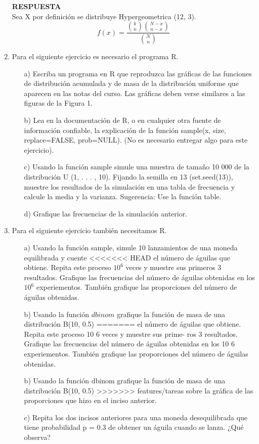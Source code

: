 \documentclass[11pt,letterpaper]{article}
\newcommand{\res}{\textbf{RESPUESTA}\\}
\begin{document}
\begin{enumerate}
\res 

Sea X por definición se distribuye Hypergeometrica (12, 3).
\begin{equation*}
f(x)= \frac{{k\choose n}{N-x\choose n-x}}{{N\choose n}}
\end{equation*}

\item Para el siguiente ejercicio es necesario el programa \textsc{R}.
\begin{itemize}
\item[a)] Escriba un programa en \textsc{R}  que reproduzca las gráficas de las funciones de distribución
acumulada y de masa de la distribución uniforme que aparecen en las notas del curso. Las gráficas deben verse similares a las figuras de la Figura 1.

\item[b)] Lea en la documentación de \textsc{R}, o en cualquier otra fuente de información confiable,
la explicación de la función sample(x, size, replace=FALSE, prob=NULL). (No es necesario entregar algo para este ejercicio).

\item[c)] Usando la función sample simule una muestra de tamaño 10 000 de la distribución
U (1, . . . , 10). Fijando la semilla en 13 (set.seed(13)), muestre los resultados de la
simulación en una tabla de frecuencia y calcule la media y la varianza. Sugerencia: Use la función table.
\item[d)] Grafique las frecuencias de la simulación anterior.
\end{itemize}


\item Para el siguiente ejercicio también necesitamos R.


\begin{itemize}
\item[a)] Usando la función sample, simule 10 lanzamientos de una moneda equilibrada y cuente
<<<<<<< HEAD
el número de águilas que obtiene. Repita este proceso $10^6$ veces y muestre sus primeros 3 resultados. Grafique las frecuencias del número de águilas obtenidas en los $10^6$ experiementos. También grafique las proporciones del número de águilas obtenidas.
\item[b)] Usando la función $dbinom$ grafique la función de masa de una distribución B(10, 0.5)
=======
el número de águilas que obtiene. Repita este proceso 10 6 veces y muestre sus prime-
ros 3 resultados. Grafique las frecuencias del número de águilas obtenidas en los 10 6
experiementos. También grafique las proporciones del número de águilas obtenidas.
\item[b)] Usando la función dbinom grafique la función de masa de una distribución B(10, 0.5)
>>>>>>> features/tareas
sobre la gráfica de las proporciones que hizo en el inciso anterior.
\item[c)] Repita los dos incisos anteriores para una moneda desequilibrada que tiene probabilidad
p = 0.3 de obtener un águila cuando se lanza. ¿Qué observa?
\end{itemize}


\end{enumerate}
\end{document}
